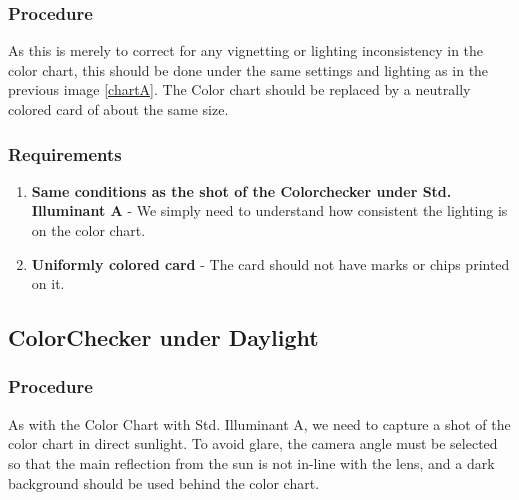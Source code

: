 \documentclass[twoside]{article}
\begin{document}
\subsubsection{Procedure}
As this is merely to correct for any vignetting or lighting inconsistency in the color chart, this should be done under the same settings and lighting as in the previous image \ref{chartA}. The Color chart should be replaced by a neutrally colored card of about the same size.

\subsubsection{Requirements}
\begin{enumerate}
    \item \textbf{Same conditions as the shot of the Colorchecker under Std. Illuminant A} - We simply need to understand how consistent the lighting is on the color chart.
    \item \textbf{Uniformly colored card} - The card should not have marks or chips printed on it.
\end{enumerate}


\newpage
\subsection{ColorChecker under Daylight}

\subsubsection{Procedure}
As with the Color Chart with Std. Illuminant A, we need to capture a shot of the color chart in direct sunlight. To avoid glare, the camera angle must be selected so that the main reflection from the sun is not in-line with the lens, and a dark background should be used behind the color chart.
\end{document}
